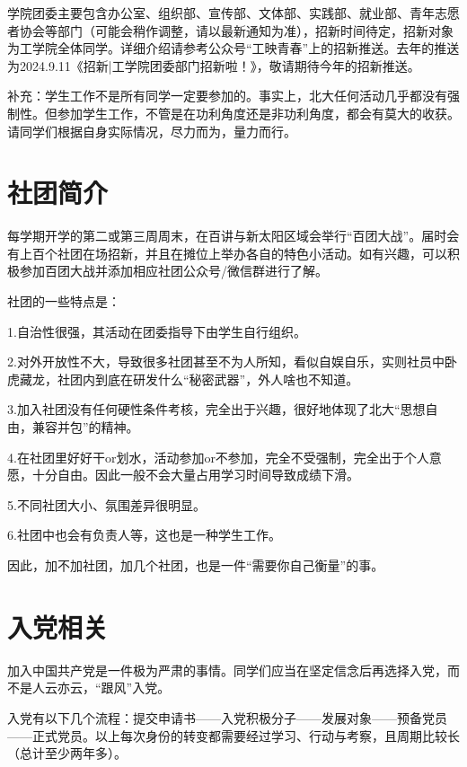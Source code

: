 \documentclass[11pt,oneside]{book}
\begin{document}
学院团委主要包含办公室、组织部、宣传部、文体部、实践部、就业部、青年志愿者协会等部门（可能会稍作调整，请以最新通知为准），招新时间待定，招新对象为工学院全体同学。详细介绍请参考公众号“工映青春”上的招新推送。去年的推送为2024.9.11《招新|工学院团委部门招新啦！》，敬请期待今年的招新推送。

\vspace{10pt}

补充：学生工作不是所有同学一定要参加的。事实上，北大任何活动几乎都没有强制性。但参加学生工作，不管是在功利角度还是非功利角度，都会有莫大的收获。请同学们根据自身实际情况，尽力而为，量力而行。

\section{社团简介}
每学期开学的第二或第三周周末，在百讲与新太阳区域会举行“百团大战”。届时会有上百个社团在场招新，并且在摊位上举办各自的特色小活动。如有兴趣，可以积极参加百团大战并添加相应社团公众号/微信群进行了解。

\vspace{10pt}

社团的一些特点是：

1.自治性很强，其活动在团委指导下由学生自行组织。

2.对外开放性不大，导致很多社团甚至不为人所知，看似自娱自乐，实则社员中卧虎藏龙，社团内到底在研发什么“秘密武器”，外人啥也不知道。

3.加入社团没有任何硬性条件考核，完全出于兴趣，很好地体现了北大“思想自由，兼容并包”的精神。

4.在社团里好好干or划水，活动参加or不参加，完全不受强制，完全出于个人意愿，十分自由。因此一般不会大量占用学习时间导致成绩下滑。

5.不同社团大小、氛围差异很明显。

6.社团中也会有负责人等，这也是一种学生工作。 

\vspace{10pt}

因此，加不加社团，加几个社团，也是一件“需要你自己衡量”的事。

\section{入党相关}
加入中国共产党是一件极为严肃的事情。同学们应当在坚定信念后再选择入党，而不是人云亦云，“跟风”入党。

\vspace{10pt}

入党有以下几个流程：提交申请书——入党积极分子——发展对象——预备党员——正式党员。以上每次身份的转变都需要经过学习、行动与考察，且周期比较长（总计至少两年多）。
\end{document}
